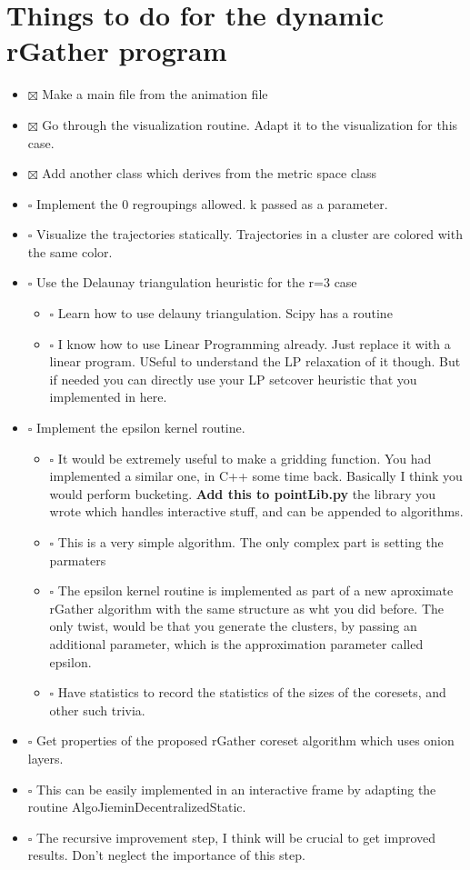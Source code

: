 \documentclass[11pt]{article}
\begin{document}
\section{Things to do for the dynamic rGather program}
\label{sec-7}
\begin{itemize}
\item $\boxtimes$ Make a main file from the animation file
\item $\boxtimes$ Go through the visualization routine. Adapt it to the visualization 
for this case.
\item $\boxtimes$ Add another class which derives from the metric space class
\item $\square$ Implement the 0 regroupings allowed. k passed as a parameter.
\item $\square$ Visualize the trajectories statically. Trajectories in a cluster are colored with the same color.
\item $\square$ Use the Delaunay triangulation heuristic for the r=3 case
\begin{itemize}
\item $\square$ Learn how to use delauny triangulation. Scipy has a routine
\item $\square$ I know how to use Linear Programming already. Just replace it with 
a linear program. USeful to understand the LP relaxation of it though. 
But if needed you can directly use your LP setcover heuristic that 
you implemented in here.
\end{itemize}
\item $\square$ Implement the epsilon kernel routine. 
\begin{itemize}
\item $\square$ It would be extremely useful to make a gridding function. 
You had implemented a similar one, in C++ some time back. 
Basically I think you would perform bucketing. \textbf{Add this to pointLib.py}
the library you wrote which handles interactive stuff, and can be appended 
to algorithms.
\item $\square$ This is a very simple algorithm. The only complex 
part is setting the parmaters
\item $\square$ The epsilon kernel routine is implemented as part of 
a new aproximate rGather algorithm with the same 
structure as wht you did before. The only twist, 
would be that you generate the clusters, by passing an 
additional parameter, which is the approximation parameter 
called epsilon.
\item $\square$ Have statistics to record the statistics of the sizes of the 
coresets, and other such trivia.
\end{itemize}
\item $\square$ Get properties of the proposed rGather coreset algorithm 
which uses onion layers.
\item $\square$ This can be easily implemented in an interactive frame 
by adapting the routine AlgoJieminDecentralizedStatic.
\item $\square$ The recursive improvement step, I think will be crucial to 
get improved results. Don't neglect the importance of this step.
\end{itemize}
\end{document}
